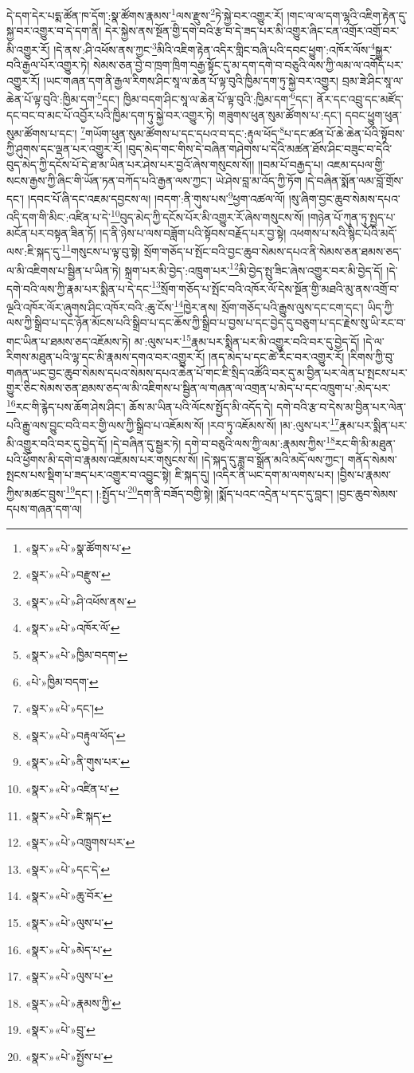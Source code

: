 དེ་དག་དེར་པདྨ་ཚོན་ཁ་དོག་:སྣ་ཚོགས་རྣམས་\footnote{«སྣར་»«པེ་»སྣ་ཚོགས་པ་}ལས་རྫུས་\footnote{«སྣར་»«པེ་»བརྫུས་}ཏེ་སྐྱེ་བར་འགྱུར་རོ། །གང་ལ་ལ་དག་ལྷའི་འཇིག་རྟེན་དུ་སྐྱ་བར་འགྱུར་བ་དེ་དག་ནི། དེར་སྐྱེས་ནས་སྔོན་གྱི་དགེ་བའི་རྩ་བ་དེ་ཟད་པར་མི་འགྱུར་ཞིང་ངན་འགྲོར་འགྲོ་བར་མི་འགྱུར་རོ། །དེ་ནས་:ཤི་འཕོས་ནས་ཀྱང་\footnote{«སྣར་»«པེ་»ཤི་འཕོས་ནས་}མིའི་འཇིག་རྟེན་འདིར་གླིང་བཞི་པའི་དབང་ཕྱུག་:འཁོར་ལོས་\footnote{«སྣར་»«པེ་»འཁོར་ལོ་}སྒྱུར་བའི་རྒྱལ་པོར་འགྱུར་ཏེ། སེམས་ཅན་བྱེ་བ་ཁྲག་ཁྲིག་བརྒྱ་སྟོང་དུ་མ་དག་དགེ་བ་བཅུའི་ལས་ཀྱི་ལམ་ལ་འགོད་པར་འགྱུར་རོ། །ཡང་གཞན་དག་ནི་རྒྱལ་རིགས་ཤིང་སཱ་ལ་ཆེན་པོ་ལྟ་བུའི་ཁྱིམ་དག་ཏུ་སྐྱེ་བར་འགྱུར། བྲམ་ཟེ་ཤིང་སཱ་ལ་ཆེན་པོ་ལྟ་བུའི་:ཁྱིམ་དག་\footnote{«སྣར་»«པེ་»ཁྱིམ་བདག་}དང་། ཁྱིམ་བདག་ཤིང་སཱ་ལ་ཆེན་པོ་ལྟ་བུའི་:ཁྱིམ་དག་\footnote{«པེ་»ཁྱིམ་བདག་}དང་། ནོར་དང་འབྲུ་དང་མཛོད་དང་བང་བ་མང་པོ་འབྱོར་པའི་ཁྱིམ་དག་ཏུ་སྐྱེ་བར་འགྱུར་ཏེ། གཟུགས་ཕུན་སུམ་ཚོགས་པ་:དང་། དབང་ཕྱུག་ཕུན་སུམ་ཚོགས་པ་དང་། \footnote{«སྣར་»«པེ་»དང་།  }གཡོག་ཕུན་སུམ་ཚོགས་པ་དང་དཔའ་བ་དང་:རྟུལ་ཕོད་\footnote{«སྣར་»«པེ་»བརྟུལ་ཕོད་}པ་དང་ཚན་པོ་ཆེ་ཆེན་པོའི་སྟོབས་ཀྱི་ཤུགས་དང་ལྡན་པར་འགྱུར་རོ། །བུད་མེད་གང་གིས་དེ་བཞིན་གཤེགས་པ་དེའི་མཚན་ཐོས་ཤིང་བཟུང་བ་དེའི་བུད་མེད་ཀྱི་དངོས་པོ་དེ་ཐ་མ་ཡིན་པར་ཤེས་པར་བྱའོ་ཞེས་གསུངས་སོ།། །།བམ་པོ་བརྒྱད་པ། འཇམ་དཔལ་གྱི་སངས་རྒྱས་ཀྱི་ཞིང་གི་ཡོན་ཏན་བཀོད་པའི་རྒྱན་ལས་ཀྱང་། ཡེ་ཤེས་བླ་མ་འོད་ཀྱི་ཏོག །དེ་བཞིན་སྨོན་ལམ་བློ་གྲོས་དང་། །དབང་པོ་ཞི་དང་འཇམ་དབྱངས་ལ། །བདག་:ནི་གུས་པས་\footnote{«སྣར་»«པེ་»ནི་གུས་པར་}ཕྱག་འཚལ་ལོ། །སུ་ཞིག་བྱང་ཆུབ་སེམས་དཔའ་འདི་དག་གི་མིང་:འཛིན་པ་དེ་\footnote{«སྣར་»«པེ་»འཛིན་པ་}བུད་མེད་ཀྱི་དངོས་པོར་མི་འགྱུར་རོ་ཞེས་གསུངས་སོ། །གཉེན་པོ་ཀུན་ཏུ་སྤྱད་པ་མངོན་པར་བསྟན་ཟིན་ཏོ། །ད་ནི་ཉེས་པ་ལས་བཟློག་པའི་སྟོབས་བརྗོད་པར་བྱ་སྟེ། འཕགས་པ་སའི་སྙིང་པོའི་མདོ་ལས་:ཇི་སྐད་དུ་\footnote{«སྣར་»«པེ་»ཇི་སྐད་}གསུངས་པ་ལྟ་བུ་སྟེ། སྲོག་གཅོད་པ་སྤོང་བའི་བྱང་ཆུབ་སེམས་དཔའ་ནི་སེམས་ཅན་ཐམས་ཅད་ལ་མི་འཇིགས་པ་སྦྱིན་པ་ཡིན་ཏེ། སྐྲག་པར་མི་བྱེད་:འཁྲུག་པར་\footnote{«སྣར་»«པེ་»འཁྲུགས་པར་}མི་བྱེད་སྤུ་ཟིང་ཞེས་འགྱུར་བར་མི་བྱེད་དོ། །དེ་དགེ་བའི་ལས་ཀྱི་རྣམ་པར་སྨིན་པ་དེ་དང་\footnote{«སྣར་»«པེ་»དང་དེ་}སྲོག་གཅོད་པ་སྤོང་བའི་འཁོར་ལོ་དེས་སྔོན་གྱི་མཐའི་མུ་ནས་འགྲོ་བ་ལྔའི་འཁོར་ལོར་ཞུགས་ཤིང་འཁོར་བའི་:ཆུ་ངོས་\footnote{«སྣར་»«པེ་»ཆུ་བོར་}ཁྱེར་ནས། སྲོག་གཅོད་པའི་རྒྱུས་ལུས་དང་ངག་དང་། ཡིད་ཀྱི་ལས་ཀྱི་སྒྲིབ་པ་དང་ཉོན་མོངས་པའི་སྒྲིབ་པ་དང་ཆོས་ཀྱི་སྒྲིབ་པ་བྱས་པ་དང་བྱེད་དུ་བཅུག་པ་དང་རྗེས་སུ་ཡི་རང་བ་གང་ཡིན་པ་ཐམས་ཅད་འཇོམས་ཏེ། མ་:ལུས་པར་\footnote{«སྣར་»«པེ་»ལུས་པ་}རྣམ་པར་སྨིན་པར་མི་འགྱུར་བའི་བར་དུ་བྱེད་དོ། །དེ་ལ་རིགས་མཐུན་པའི་ལྷ་དང་མི་རྣམས་དགའ་བར་འགྱུར་རོ། །ནད་མེད་པ་དང་ཚེ་རིང་བར་འགྱུར་རོ། །རིགས་ཀྱི་བུ་གཞན་ཡང་བྱང་ཆུབ་སེམས་དཔའ་སེམས་དཔའ་ཆེན་པོ་གང་ཇི་སྲིད་འཚོའི་བར་དུ་མ་བྱིན་པར་ལེན་པ་སྤངས་པར་གྱུར་ཅིང་སེམས་ཅན་ཐམས་ཅད་ལ་མི་འཇིགས་པ་སྦྱིན་ལ་གཞན་ལ་འགྲན་པ་མེད་པ་དང་འཁྲུག་པ་:མེད་པར་\footnote{«སྣར་»«པེ་»མེད་པ་}རང་གི་རྙེད་པས་ཆོག་ཤེས་ཤིང་། ཆོས་མ་ཡིན་པའི་ལོངས་སྤྱོད་མི་འདོད་དེ། དགེ་བའི་རྩ་བ་དེས་མ་བྱིན་པར་ལེན་པའི་རྒྱུ་ལས་བྱུང་བའི་བར་གྱི་ལས་ཀྱི་སྒྲིབ་པ་འཇོམས་སོ། །རབ་ཏུ་འཇོམས་སོ། །མ་:ལུས་པར་\footnote{«སྣར་»«པེ་»ལུས་པ་}རྣམ་པར་སྨིན་པར་མི་འགྱུར་བའི་བར་དུ་བྱེད་དོ། །དེ་བཞིན་དུ་སྦྱར་ཏེ། དགེ་བ་བཅུའི་ལས་ཀྱི་ལམ་:རྣམས་ཀྱིས་\footnote{«སྣར་»«པེ་»རྣམས་ཀྱི་}རང་གི་མི་མཐུན་པའི་ཕྱོགས་མི་དགེ་བ་རྣམས་འཇོམས་པར་གསུངས་སོ། །དེ་སྐད་དུ་ཟླ་བ་སྒྲོན་མའི་མདོ་ལས་ཀྱང་། གནོད་སེམས་སྤངས་པས་སྡིག་པ་ཟད་པར་འགྱུར་བ་འབྱུང་སྟེ། ཇི་སྐད་དུ། །འདིར་ནི་ཡང་དག་མ་ལགས་པར། །བྱིས་པ་རྣམས་ཀྱིས་མཚང་བྲུས་\footnote{«སྣར་»«པེ་»བྲུ་}དང་། །:སྤྱོད་པ་\footnote{«སྣར་»«པེ་»སྤྱོས་པ་}དག་ནི་བཟོད་བགྱི་སྟེ། །སྨོད་པའང་འདྲེན་པ་དང་དུ་བླང་། །བྱང་ཆུབ་སེམས་དཔས་གཞན་དག་ལ། 